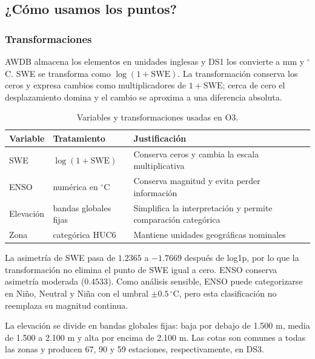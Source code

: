 \documentclass{article}
\begin{document}
\subsection{¿Cómo usamos los puntos?}
\subsubsection{Transformaciones}
AWDB almacena los elementos en unidades inglesas y DS1 los convierte a mm y $^{\circ}$C. SWE se transforma como $\log(1+\mathrm{SWE})$. La transformación conserva los ceros y expresa cambios como multiplicadores de $1+\mathrm{SWE}$; cerca de cero el desplazamiento domina y el cambio se aproxima a una diferencia absoluta.

\begin{table}[ht]
\centering
\scriptsize
\setlength{\tabcolsep}{3pt}
\begin{tabular}{lp{3.2cm}p{6.3cm}}
\toprule
Variable & Tratamiento & Justificación \\
\midrule
SWE & $\log(1+\mathrm{SWE})$ & Conserva ceros y cambia la escala multiplicativa \\
ENSO & numérica en $^{\circ}$C & Conserva magnitud y evita perder información \\
Elevación & bandas globales fijas & Simplifica la interpretación y permite comparación categórica \\
Zona & categórica HUC6 & Mantiene unidades geográficas nominales \\
\bottomrule
\end{tabular}
\caption{Variables y transformaciones usadas en O3.}
\label{tab:transform}
\end{table}

La asimetría de SWE pasa de $1.2365$ a $-1.7669$ después de log1p, por lo que la transformación no elimina el punto de SWE igual a cero. ENSO conserva asimetría moderada ($0.4533$). Como análisis sensible, ENSO puede categorizarse en Niño, Neutral y Niña con el umbral $\pm0.5\,^{\circ}$C, pero esta clasificación no reemplaza su magnitud continua.

La elevación se divide en bandas globales fijas: baja por debajo de 1.500 m, media de 1.500 a 2.100 m y alta por encima de 2.100 m. Las cotas son comunes a todas las zonas y producen 67, 90 y 59 estaciones, respectivamente, en DS3.
\end{document}
